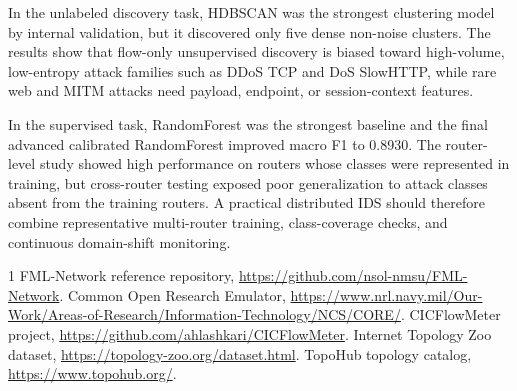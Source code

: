 \documentclass[journal,onecolumn]{IEEEtran}
\begin{document}
In the unlabeled discovery task, HDBSCAN was the strongest clustering model by internal validation, but it discovered only five dense non-noise clusters. The results show that flow-only unsupervised discovery is biased toward high-volume, low-entropy attack families such as DDoS TCP and DoS SlowHTTP, while rare web and MITM attacks need payload, endpoint, or session-context features.

In the supervised task, RandomForest was the strongest baseline and the final advanced calibrated RandomForest improved macro F1 to 0.8930. The router-level study showed high performance on routers whose classes were represented in training, but cross-router testing exposed poor generalization to attack classes absent from the training routers. A practical distributed IDS should therefore combine representative multi-router training, class-coverage checks, and continuous domain-shift monitoring.

\begin{thebibliography}{1}
FML-Network reference repository, \url{https://github.com/nsol-nmsu/FML-Network}.
Common Open Research Emulator, \url{https://www.nrl.navy.mil/Our-Work/Areas-of-Research/Information-Technology/NCS/CORE/}.
CICFlowMeter project, \url{https://github.com/ahlashkari/CICFlowMeter}.
Internet Topology Zoo dataset, \url{https://topology-zoo.org/dataset.html}.
TopoHub topology catalog, \url{https://www.topohub.org/}.
\end{thebibliography}
\end{document}
